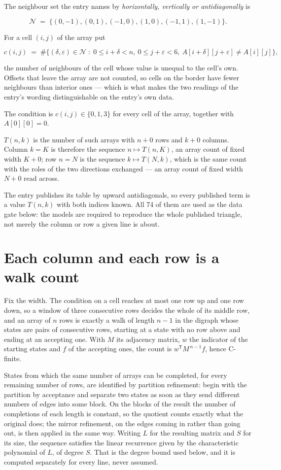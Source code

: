 \documentclass[11pt]{article}
\theoremstyle{definition}
\begin{document}
The neighbour set the entry names by {\itshape horizontally, vertically or antidiagonally} is

\[\mathcal{N} \;=\; \{(0,-1), (0,1), (-1,0), (1,0), (-1,1), (1,-1)\}.\]

For a cell $(i,j)$ of the array put

\[c(i,j) \;=\; \#\bigl\{(\delta,\varepsilon)\in\mathcal{N} \;:\; 0\le i+\delta<n,\ 0\le j+\varepsilon<6,\ A[i+\delta][j+\varepsilon] \neq A[i][j]\bigr\},\]

the number of neighbours of the cell whose value is unequal to the cell's own. Offsets that leave the array are not counted, so cells on the border have fewer neighbours than interior ones --- which is what makes the two readings of the entry's wording distinguishable on the entry's own data.

The condition is $c(i,j) \in \{0, 1, 3\}$ for every cell of the array, together with $A[0][0]=0$.

$T(n,k)$ is the number of such arrays with $n + 0$ rows and $k + 0$ columns. Column $k = K$ is therefore the sequence $n \mapsto T(n,K)$, an array count of fixed width $K + 0$; row $n = N$ is the sequence $k \mapsto T(N,k)$, which is the same count with the roles of the two directions exchanged --- an array count of fixed width $N + 0$ read across.

The entry publishes its table by upward antidiagonals, so every published term is a value $T(n,k)$ with both indices known. All 74 of them are used as the data gate below: the models are required to reproduce the whole published triangle, not merely the column or row a given line is about.

\section{Each column and each row is a walk count}

Fix the width. The condition on a cell reaches at most one row up and one row down, so a window of three consecutive rows decides the whole of its middle row, and an array of $n$ rows is exactly a walk of length $n-1$ in the digraph whose states are pairs of consecutive rows, starting at a state with no row above and ending at an accepting one. With $M$ its adjacency matrix, $w$ the indicator of the starting states and $f$ of the accepting ones, the count is $w^{\mathsf T}M^{\,n-1}f$, hence C-finite.

States from which the same number of arrays can be completed, for every remaining number of rows, are identified by partition refinement: begin with the partition by acceptance and separate two states as soon as they send different numbers of edges into some block. On the blocks of the result the number of completions of each length is constant, so the quotient counts exactly what the original does; the mirror refinement, on the edges coming in rather than going out, is then applied in the same way. Writing $L$ for the resulting matrix and $S$ for its size, the sequence satisfies the linear recurrence given by the characteristic polynomial of $L$, of degree $S$. That is the degree bound used below, and it is computed separately for every line, never assumed.
\end{document}
